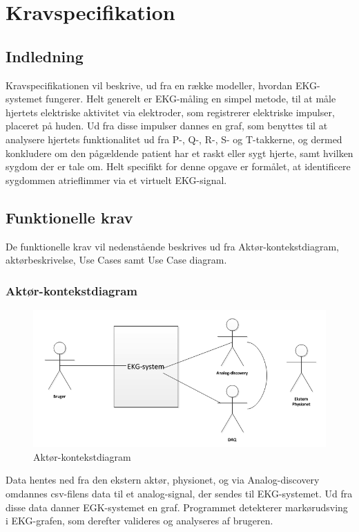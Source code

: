 \chapter{Kravspecifikation}

\section{Indledning}
Kravspecifikationen vil beskrive, ud fra en række modeller, hvordan EKG-systemet fungerer. Helt generelt er EKG-måling en simpel metode, til at måle hjertets elektriske aktivitet via elektroder, som registrerer elektriske impulser, placeret på huden. Ud fra disse impulser dannes en graf, som benyttes til at analysere hjertets funktionalitet ud fra P-, Q-, R-, S- og T-takkerne, og dermed konkludere om den pågældende patient har et raskt eller sygt hjerte, samt hvilken sygdom der er tale om. Helt specifikt for denne opgave er formålet, at identificere sygdommen atrieflimmer via et virtuelt EKG-signal. 

\section{Funktionelle krav}
De funktionelle krav vil nedenstående beskrives ud fra Aktør-kontekstdiagram, aktørbeskrivelse, Use Cases samt Use Case diagram. 

\subsection{Aktør-kontekstdiagram}

\begin{figure}[htb]
	\centering
	\includegraphics[width=1\textwidth]{Figurer/Snip20150409_30}
	\caption{Aktør-kontekstdiagram}
	\label{fig:aktoerbeskrivelse}
\end{figure}

Data hentes ned fra den ekstern aktør, physionet, og via Analog-discovery omdannes csv-filens data til et analog-signal, der sendes til EKG-systemet. Ud fra disse data danner EGK-systemet en graf. Programmet detekterer markørudsving i EKG-grafen, som derefter valideres og analyseres af brugeren.

